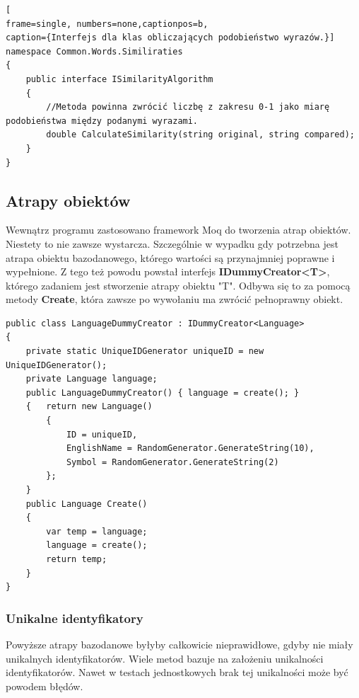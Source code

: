 \begin{minipage}{\linewidth}
\begin{lstlisting}[
frame=single, numbers=none,captionpos=b, 
caption={Interfejs dla klas obliczających podobieństwo wyrazów.}]
namespace Common.Words.Similiraties
{
    public interface ISimilarityAlgorithm
    {
    	//Metoda powinna zwrócić liczbę z zakresu 0-1 jako miarę podobieństwa między podanymi wyrazami.
        double CalculateSimilarity(string original, string compared);
    }
}
\end{lstlisting}
\end{minipage}


\subsection{Atrapy obiektów}

Wewnątrz programu zastosowano framework Moq do tworzenia atrap obiektów. Niestety to nie zawsze wystarcza. Szczególnie w wypadku gdy potrzebna jest atrapa obiektu bazodanowego, którego wartości są przynajmniej poprawne i wypełnione. Z tego też powodu powstał interfejs \textbf{IDummyCreator<T>}, którego zadaniem jest stworzenie atrapy obiektu "T". Odbywa się to za pomocą metody \textbf{Create}, która zawsze po wywołaniu ma zwrócić pełnoprawny obiekt. 


\begin{minipage}{\linewidth}
\begin{lstlisting}[label={lst:dummyCreator},
frame=single, numbers=none,captionpos=b, 
caption={Przykład kreatora atrap na podstawie LanguageDummyCreator.}]
public class LanguageDummyCreator : IDummyCreator<Language>
{
	private static UniqueIDGenerator uniqueID = new UniqueIDGenerator();
	private Language language;
	public LanguageDummyCreator() { language = create(); }
	{   return new Language()
		{
			ID = uniqueID,
			EnglishName = RandomGenerator.GenerateString(10),
			Symbol = RandomGenerator.GenerateString(2)
		};
	}
	public Language Create()
	{
		var temp = language;
		language = create();
		return temp;
	}
}
\end{lstlisting}
\end{minipage}

\subsubsection{Unikalne identyfikatory}

Powyższe atrapy bazodanowe byłyby całkowicie nieprawidłowe, gdyby nie miały unikalnych identyfikatorów. Wiele metod bazuje na założeniu unikalności identyfikatorów. Nawet w testach jednostkowych brak tej unikalności może być powodem błędów.

